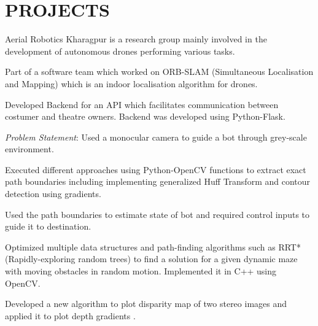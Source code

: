 \documentclass[]{deedy-resume-openfont}
\begin{document}
\begin{minipage}[t]{0.66\textwidth} 



\section{PROJECTS}

\vspace{\topsep} %
\begin{tightemize}
\item Aerial Robotics Kharagpur is a research group mainly involved in the development of autonomous drones performing various tasks.   
\item Part of a software team which worked on ORB-SLAM (Simultaneous Localisation and Mapping) which is an indoor localisation algorithm for drones.
\end{tightemize}
\sectionsep

\begin{tightemize}
\item Developed Backend for an API which facilitates communication between costumer and theatre owners. Backend was developed using Python-Flask.
\end{tightemize}
\sectionsep

\begin{tightemize}
\item {\emph{Problem Statement}:} Used a monocular camera to guide a bot through grey-scale environment.   
\item Executed different approaches using Python-OpenCV functions to extract exact path boundaries including implementing generalized Huff Transform and contour detection using gradients. 
\item Used the path boundaries to estimate state of bot and required control inputs to guide it to destination.
\end{tightemize}
\sectionsep

\begin{tightemize}
\item Optimized multiple data structures and path-finding algorithms such as RRT*(Rapidly-exploring random trees) to find a solution for a given dynamic maze with moving obstacles in random motion. Implemented it in C++ using OpenCV.
\item Developed a new algorithm to plot disparity map of two stereo images and applied it to plot depth gradients .


\end{tightemize}
\end{minipage}
\end{document}
